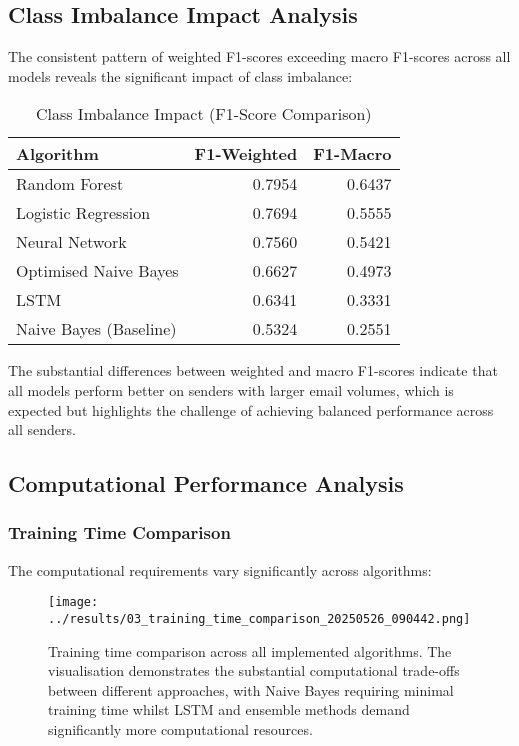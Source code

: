 \documentclass[11pt,a4paper]{article}
\begin{document}
\subsection{Class Imbalance Impact Analysis}

The consistent pattern of weighted F1-scores exceeding macro F1-scores across all models reveals the significant impact of class imbalance:

\begin{table}[H]
    \centering
    \caption{Class Imbalance Impact (F1-Score Comparison)}
    \begin{tabular}{@{}lrr@{}}
        \toprule
        \textbf{Algorithm} & \textbf{F1-Weighted} & \textbf{F1-Macro} \\
        \midrule
        Random Forest & 0.7954 & 0.6437 \\
        Logistic Regression & 0.7694 & 0.5555 \\
        Neural Network & 0.7560 & 0.5421 \\
        Optimised Naive Bayes & 0.6627 & 0.4973 \\
        LSTM & 0.6341 & 0.3331 \\
        Naive Bayes (Baseline) & 0.5324 & 0.2551 \\
        \bottomrule
    \end{tabular}
\end{table}

The substantial differences between weighted and macro F1-scores indicate that all models perform better on senders with larger email volumes, which is expected but highlights the challenge of achieving balanced performance across all senders.

\subsection{Computational Performance Analysis}

\subsubsection{Training Time Comparison}

The computational requirements vary significantly across algorithms:

\begin{figure}[H]
    \centering
    \texttt{[image: ../results/03\_training\_time\_comparison\_20250526\_090442.png]}
    \caption{Training time comparison across all implemented algorithms. The visualisation demonstrates the substantial computational trade-offs between different approaches, with Naive Bayes requiring minimal training time whilst LSTM and ensemble methods demand significantly more computational resources.}
    \label{fig:training_time}
\end{figure}
\end{document}

